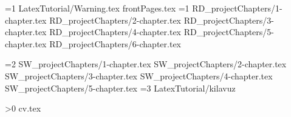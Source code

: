 \documentclass[a4paper,12pt,oneside,openany]{book}
\begin{document}
\newcommand{\projecttype}{0}
\ifnum\projecttype=1
 {LatexTutorial/Warning.tex}
\else
 {frontPages.tex}
\fi
\ifnum\projecttype=1
 {RD_projectChapters/1-chapter.tex}
 {RD_projectChapters/2-chapter.tex}
 {RD_projectChapters/3-chapter.tex}
 {RD_projectChapters/4-chapter.tex}
 {RD_projectChapters/5-chapter.tex}
 {RD_projectChapters/6-chapter.tex}

\fi
\ifnum\projecttype=2
 {SW_projectChapters/1-chapter.tex}
 {SW_projectChapters/2-chapter.tex}
 {SW_projectChapters/3-chapter.tex}
 {SW_projectChapters/4-chapter.tex}
 {SW_projectChapters/5-chapter.tex}
\fi
\ifnum\projecttype=3
 {LatexTutorial/kilavuz}
\fi

\newpage\appendix


\newpage
{}
\singlespacing
\printbibliography[title={\bibName}]

\ifnum{}
\newpage
{}

\ifnum\projecttype>0
 {cv.tex}
\fi
\fi
\end{document}
